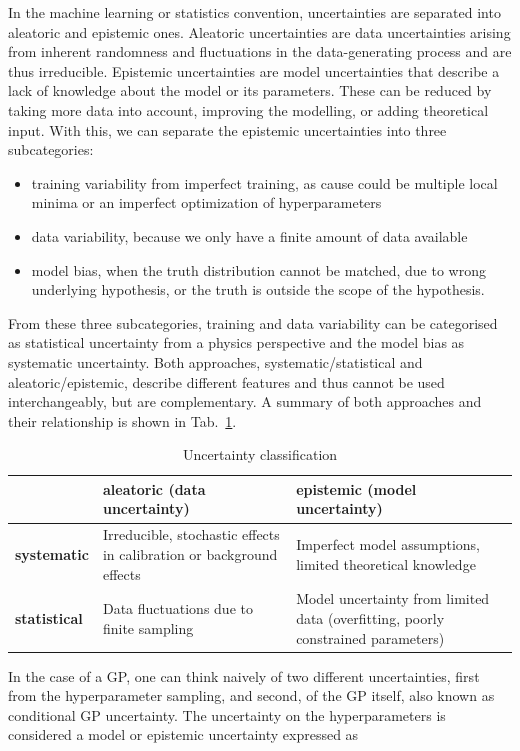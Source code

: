 \documentclass[11pt,a4paper]{article}
\begin{document}
In the machine learning or statistics convention, uncertainties are separated into aleatoric and epistemic ones.
Aleatoric uncertainties are data uncertainties arising from inherent randomness and fluctuations in the data-generating process and are thus irreducible. 
Epistemic uncertainties are model uncertainties that describe a lack of knowledge about the model or its parameters. These can be reduced by taking more data into account, improving the modelling, or adding theoretical input. With this, we can separate the epistemic uncertainties into three subcategories:
%
\begin{itemize}
    \item training variability from imperfect training, as cause could be multiple local minima or an imperfect optimization of hyperparameters
    \item data variability, because we only have a finite amount of data available
    \item model bias, when the truth distribution cannot be matched, due to wrong underlying hypothesis, or the truth is outside the scope of the hypothesis.
\end{itemize}
%
From these three subcategories, training and data variability can be categorised as statistical uncertainty from a physics perspective and the model bias as systematic uncertainty.
Both approaches, systematic/statistical and aleatoric/epistemic, describe different features and thus cannot be used interchangeably, but are complementary. A summary of both approaches and their relationship is shown in Tab.~\ref{tab:unc}.
%
\begin{table}[htpb]
    \centering
    \begin{tabularx}{\linewidth}{lXX}
        \toprule
        & \textbf{aleatoric (data uncertainty)} & \textbf{epistemic (model uncertainty)}\\
        \midrule
        \textbf{systematic} &
        Irreducible, stochastic effects in calibration or background effects &
        Imperfect model assumptions, limited theoretical knowledge \\
        \midrule
        \textbf{statistical} &
        Data fluctuations due to finite sampling & 
        Model uncertainty from limited data (overfitting, poorly constrained parameters)\\
        \bottomrule
    \end{tabularx}
    \caption{Uncertainty classification}
    \label{tab:unc}
\end{table}
%
In the case of a GP, one can think naively of two different uncertainties, first from the hyperparameter sampling, and second, of the GP itself, also known as conditional GP uncertainty. The uncertainty on the hyperparameters is considered a model or epistemic uncertainty expressed as
\end{document}
